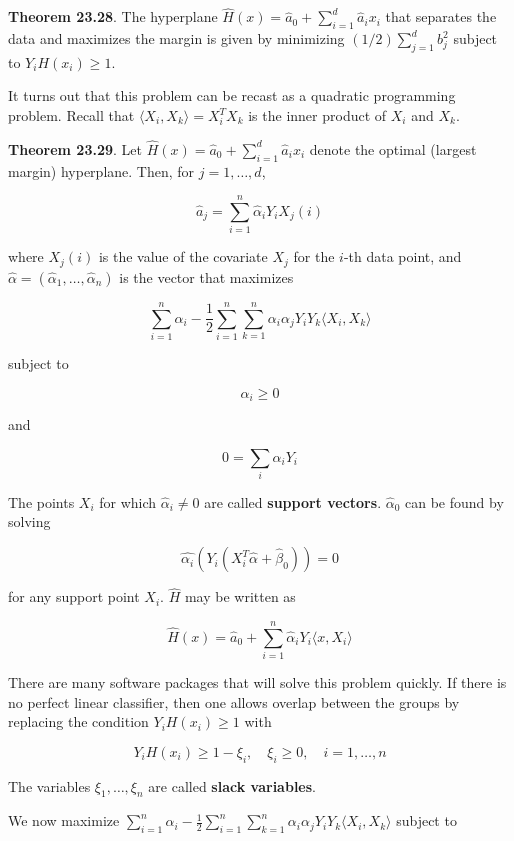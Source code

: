 \textbf{Theorem 23.28}. The hyperplane
\(\hat{H}(x) = \hat{a}_{0} + \sum_{i=1}^{d} \hat{a}_{i} x_{i}\) that separates
the data and maximizes the margin is given by minimizing
\((1/2) \sum_{j=1}^{d} b_{j}^{2}\) subject to \(Y_{i} H(x_{i}) \geq 1\).

It turns out that this problem can be recast as a quadratic programming
problem. Recall that \(\langle X_{i}, X_{k} \rangle = X_{i}^T X_{k}\) is the
inner product of \(X_{i}\) and \(X_{k}\).

\textbf{Theorem 23.29}. Let
\(\hat{H}(x) = \hat{a}_{0} + \sum_{i=1}^{d} \hat{a}_{i} x_{i}\) denote the
optimal (largest margin) hyperplane. Then, for \(j = 1, \dots, d\),

\[ \hat{a}_{j} = \sum_{i=1}^{n} \hat{\alpha}_{i} Y_{i} X_{j}(i) \]

where \(X_{j}(i)\) is the value of the covariate \(X_{j}\) for the \(i\)-th
data point, and
\(\hat{\alpha} = (\hat{\alpha}_{1}, \dots, \hat{\alpha}_{n})\) is the vector
that maximizes

\[ \sum_{i=1}^{n} \alpha_{i} - \frac{1}{2} \sum_{i=1}^{n} \sum_{k=1}^{n} \alpha_{i} \alpha_{j} Y_{i} Y_{k} \langle X_{i}, X_{k} \rangle \]

subject to

\[ \alpha_{i} \geq 0 \]

and

\[ 0 = \sum_{i} \alpha_{i} Y_{i} \]

The points \(X_{i}\) for which \(\hat{\alpha}_{i} \neq 0\) are called
\textbf{support vectors}. \(\hat{\alpha}_{0}\) can be found by solving

\[ \hat{\alpha_{i}}(Y_{i} (X_{i}^T \hat{\alpha} + \hat{\beta}_{0})) = 0\]

for any support point \(X_{i}\). \(\hat{H}\) may be written as

\[ \hat{H}(x) = \hat{a}_{0} + \sum_{i=1}^{n} \hat{\alpha}_{i} Y_{i} \langle x, X_{i} \rangle \]

There are many software packages that will solve this problem quickly.
If there is no perfect linear classifier, then one allows overlap
between the groups by replacing the condition \(Y_{i} H(x_{i}) \geq 1\) with

\[ Y_{i} H(x_{i}) \geq 1 - \xi_{i},
\quad \xi_{i} \geq 0,
\quad i = 1, \dots, n
\]

The variables \(\xi_{1}, \dots, \xi_{n}\) are called \textbf{slack
variables}.

We now maximize
\(\sum_{i=1}^{n} \alpha_{i} - \frac{1}{2} \sum_{i=1}^{n} \sum_{k=1}^{n} \alpha_{i} \alpha_{j} Y_{i} Y_{k} \langle X_{i}, X_{k} \rangle\)
subject to

